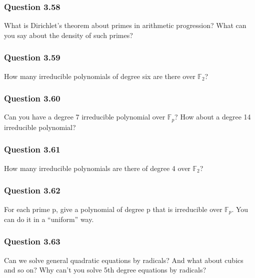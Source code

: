 \hypertarget{question-3.58}{%
\subsubsection{Question 3.58}\label{question-3.58}}

What is Dirichlet's theorem about primes in arithmetic progression? What
can you say about the density of such primes?

\hypertarget{question-3.59}{%
\subsubsection{Question 3.59}\label{question-3.59}}

How many irreducible polynomials of degree six are there over
\({\mathbb{F}}_2\)?

\hypertarget{question-3.60}{%
\subsubsection{Question 3.60}\label{question-3.60}}

Can you have a degree 7 irreducible polynomial over \({\mathbb{F}}_p\)?
How about a degree 14 irreducible polynomial?

\hypertarget{question-3.61}{%
\subsubsection{Question 3.61}\label{question-3.61}}

How many irreducible polynomials are there of degree 4 over
\({\mathbb{F}}_2\)?

\hypertarget{question-3.62}{%
\subsubsection{Question 3.62}\label{question-3.62}}

For each prime p, give a polynomial of degree p that is irreducible over
\({\mathbb{F}}_p\). You can do it in a ``uniform'' way.

\hypertarget{question-3.63}{%
\subsubsection{Question 3.63}\label{question-3.63}}

Can we solve general quadratic equations by radicals? And what about
cubics and so on? Why can't you solve 5th degree equations by radicals?

